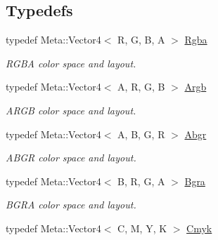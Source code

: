 \subsection*{Typedefs}
\begin{DoxyCompactItemize}
\item 
\hypertarget{group___color_space_ga52ed562e9155b12e5395633a01476810}{typedef Meta\-::\-Vector4$<$ R, G, B, A $>$ \hyperlink{group___color_space_ga52ed562e9155b12e5395633a01476810}{Rgba}}\label{group___color_space_ga52ed562e9155b12e5395633a01476810}

\begin{DoxyCompactList}\small\item\em R\-G\-B\-A color space and layout. \end{DoxyCompactList}\item 
\hypertarget{group___color_space_gac3a42db968dfe7d65b7b74f49de821c3}{typedef Meta\-::\-Vector4$<$ A, R, G, B $>$ \hyperlink{group___color_space_gac3a42db968dfe7d65b7b74f49de821c3}{Argb}}\label{group___color_space_gac3a42db968dfe7d65b7b74f49de821c3}

\begin{DoxyCompactList}\small\item\em A\-R\-G\-B color space and layout. \end{DoxyCompactList}\item 
\hypertarget{group___color_space_gae0496dd76c54f129381947440d56a874}{typedef Meta\-::\-Vector4$<$ A, B, G, R $>$ \hyperlink{group___color_space_gae0496dd76c54f129381947440d56a874}{Abgr}}\label{group___color_space_gae0496dd76c54f129381947440d56a874}

\begin{DoxyCompactList}\small\item\em A\-B\-G\-R color space and layout. \end{DoxyCompactList}\item 
\hypertarget{group___color_space_gadb2e9d99bf441a224f4d628ad62a0bd2}{typedef Meta\-::\-Vector4$<$ B, R, G, A $>$ \hyperlink{group___color_space_gadb2e9d99bf441a224f4d628ad62a0bd2}{Bgra}}\label{group___color_space_gadb2e9d99bf441a224f4d628ad62a0bd2}

\begin{DoxyCompactList}\small\item\em B\-G\-R\-A color space and layout. \end{DoxyCompactList}\item 
\hypertarget{group___color_space_ga3d376efd2059bb15b8fd696946e051ff}{typedef Meta\-::\-Vector4$<$ C, M, Y, K $>$ \hyperlink{group___color_space_ga3d376efd2059bb15b8fd696946e051ff}{Cmyk}}\label{group___color_space_ga3d376efd2059bb15b8fd696946e051ff}


\end{DoxyCompactItemize}
